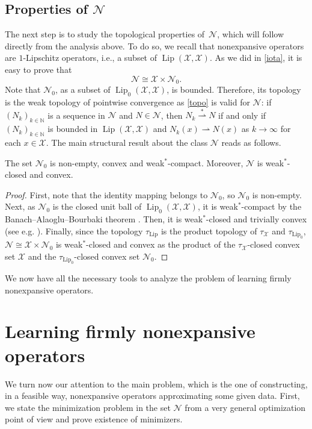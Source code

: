 \documentclass[onefignum,onetabnum]{siamonline250211}
\newcommand{\Lip}{\operatorname{Lip}}
\newcommand{\N}{\mathcal{N}}
\newcommand{\weakk}{\stackrel{\ast}{\rightharpoonup}}
\newcommand{\cX}{\mathcal{X}}
\begin{document}
\subsection{\texorpdfstring{Properties of $\N$}{Properties of N}}
The next step is to study the topological properties of~$\mathcal{N}$, which will follow directly from the analysis above. To do so, we recall that nonexpansive operators are $1$-Lipschitz operators, i.e., a subset of $\Lip(\cX, \cX)$. As we did in \cref{iota}, it is easy to prove that
$$
\mathcal{N}\cong \cX\times\N_0.
$$
Note that $\N_0$, as a subset of $\Lip_0(\cX, \cX)$, is bounded. Therefore, its topology is the weak topology of pointwise convergence as \cref{topo} is valid for $\mathcal{N}$: if $(N_k)_{k\in\mathbb{N}}$ is a sequence in $\N$ and $N\in\N$, then $N_k\weakk N$ if and only if $(N_k)_{k\in\mathbb{N}}$ is bounded in $\Lip(\cX, \cX)$ and $N_k(x)\rightharpoonup N(x)$ as $k\to\infty$ for each $x\in\cX$. The main structural result about the class $\N$ reads as follows.
\begin{corollary}\label{nnzero}
The set $\N_0$ is non-empty, convex and weak$^*$-compact. Moreover, $\N$ is weak$^*$-closed and convex.
\end{corollary}
\begin{proof}
First, note that the identity mapping belongs to $\N_0$, so $\N_0$ is non-empty. Next, as $\mathcal{N}_0$ is the closed unit ball of $\Lip_0(\cX, \cX)$, it is weak$^*$-compact by the Banach--Alaoglu--Bourbaki theorem \cite[Theorem 1.4.18]{Cobzas2019}. Then, it is weak$^*$-closed and trivially convex (see e.g. \cite[Corollary 2.10.9]{megg}). Finally, since the topology $\tau_{\Lip}$ is the product topology of $\tau_{\cX}$ and $\tau_{\Lip_0}$, $\N\cong\cX\times\N_0$ is weak$^*$-closed and convex as the product of the $\tau_{\cX}$-closed convex set $\cX$ and the $\tau_{\Lip_0}$-closed convex set $\N_0$.
\end{proof}
We now have all the necessary tools to analyze the problem of learning firmly nonexpansive operators.

\section{Learning firmly nonexpansive operators}\label{sec3}
We turn now our attention to the main problem, which is the one of constructing, in a feasible way, nonexpansive operators approximating some given data. First, we state the minimization problem in the set $\N$ from a very general optimization point of view and prove existence of minimizers.
\end{document}
